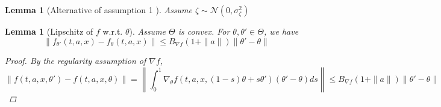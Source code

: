 \documentclass{article}
\newtheorem{lem}[thm]{Lemma}
\theoremstyle{definition}
\theoremstyle{remark}
\theoremstyle{mystyle}
\newcommand{\1}{\mathbbm{1}}
\begin{document}
\begin{lem}[Alternative of assumption 1 ]
Assume $\zeta\sim \mathcal{N}(0,\sigma_\zeta^2)$
    
\end{lem}
\begin{lem}[Lipschitz of $f$ w.r.t. $\theta$]
Assume $\Theta$ is convex. For $\theta,\theta'\in \Theta$, we have
\begin{equation}
    \|f_{\theta'}(t,a,x)-f_\theta(t,a,x)\|\leq B_{\nabla f}(1+\|a\|)\|\theta'-\theta\|
\end{equation}
\begin{proof}
    By the regularity assumption of $\nabla f$, 
    \[\|f(t,a,x,\theta')-f(t,a,x,\theta)\|=\left\|\int^1_0\nabla_\theta f (t,a,x, (1-s)\theta+s\theta')(\theta'-\theta)ds\right\| \leq B_{\nabla f}(1+\|a\|)\|\theta'-\theta\|\]
\end{proof}
\end{lem}
\end{document}
